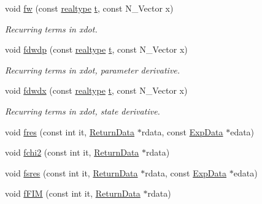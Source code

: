 \begin{DoxyCompactItemize}
void \mbox{\hyperlink{classamici_1_1_model_aa8570e0334110a30e2e459efa53df9be}{fw}} (const \mbox{\hyperlink{namespaceamici_a1bdce28051d6a53868f7ccbf5f2c14a3}{realtype}} \mbox{\hyperlink{classamici_1_1_model_a711281d57e9710226face29151cc4641}{t}}, const N\+\_\+\+Vector x)
\begin{DoxyCompactList}\small\item\em Recurring terms in xdot. \end{DoxyCompactList}\item 
void \mbox{\hyperlink{classamici_1_1_model_abccb9631015d7f75c8afc249c9dbd002}{fdwdp}} (const \mbox{\hyperlink{namespaceamici_a1bdce28051d6a53868f7ccbf5f2c14a3}{realtype}} \mbox{\hyperlink{classamici_1_1_model_a711281d57e9710226face29151cc4641}{t}}, const N\+\_\+\+Vector x)
\begin{DoxyCompactList}\small\item\em Recurring terms in xdot, parameter derivative. \end{DoxyCompactList}\item 
void \mbox{\hyperlink{classamici_1_1_model_abb03525327d4536166bc1e072fe34530}{fdwdx}} (const \mbox{\hyperlink{namespaceamici_a1bdce28051d6a53868f7ccbf5f2c14a3}{realtype}} \mbox{\hyperlink{classamici_1_1_model_a711281d57e9710226face29151cc4641}{t}}, const N\+\_\+\+Vector x)
\begin{DoxyCompactList}\small\item\em Recurring terms in xdot, state derivative. \end{DoxyCompactList}\item 
void \mbox{\hyperlink{classamici_1_1_model_a991a9aab9f325625a35179fa601fa426}{fres}} (const int it, \mbox{\hyperlink{classamici_1_1_return_data}{Return\+Data}} $\ast$rdata, const \mbox{\hyperlink{classamici_1_1_exp_data}{Exp\+Data}} $\ast$edata)
\item 
void \mbox{\hyperlink{classamici_1_1_model_aaf1dc93d4591b179951824fc3b750646}{fchi2}} (const int it, \mbox{\hyperlink{classamici_1_1_return_data}{Return\+Data}} $\ast$rdata)
\item 
void \mbox{\hyperlink{classamici_1_1_model_a2a774934ab3b0a22a706f6328dd95597}{fsres}} (const int it, \mbox{\hyperlink{classamici_1_1_return_data}{Return\+Data}} $\ast$rdata, const \mbox{\hyperlink{classamici_1_1_exp_data}{Exp\+Data}} $\ast$edata)
\item 
void \mbox{\hyperlink{classamici_1_1_model_aba7a1237e503813d9ec7ca56413f1e1d}{f\+F\+IM}} (const int it, \mbox{\hyperlink{classamici_1_1_return_data}{Return\+Data}} $\ast$rdata)
\item 

\end{DoxyCompactItemize}
